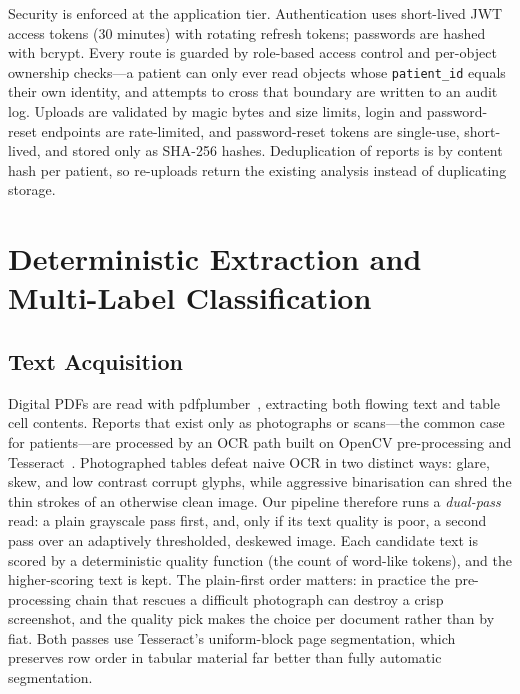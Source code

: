 \documentclass[conference]{IEEEtran}
\begin{document}
Security is enforced at the application tier. Authentication uses
short-lived JWT access tokens (30 minutes) with rotating refresh
tokens; passwords are hashed with bcrypt. Every route is guarded by
role-based access control and per-object ownership checks---a patient
can only ever read objects whose \texttt{patient\_id} equals their own
identity, and attempts to cross that boundary are written to an audit
log. Uploads are validated by magic bytes and size limits, login and
password-reset endpoints are rate-limited, and password-reset tokens
are single-use, short-lived, and stored only as SHA-256 hashes.
Deduplication of reports is by content hash per patient, so re-uploads
return the existing analysis instead of duplicating storage.

\section{Deterministic Extraction and Multi-Label Classification}

\subsection{Text Acquisition}
Digital PDFs are read with pdfplumber~\cite{pdfplumber}, extracting both
flowing text and table cell contents. Reports that exist only as
photographs or scans---the common case for patients---are processed by
an OCR path built on OpenCV pre-processing and
Tesseract~\cite{smith2007tesseract}. Photographed tables defeat naive
OCR in two distinct ways: glare, skew, and low contrast corrupt glyphs,
while aggressive binarisation can shred the thin strokes of an
otherwise clean image. Our pipeline therefore runs a \emph{dual-pass}
read: a plain grayscale pass first, and, only if its text quality is
poor, a second pass over an adaptively thresholded, deskewed image.
Each candidate text is scored by a deterministic quality function
(the count of word-like tokens), and the higher-scoring text is kept.
The plain-first order matters: in practice the pre-processing chain
that rescues a difficult photograph can destroy a crisp screenshot,
and the quality pick makes the choice per document rather than by
fiat. Both passes use Tesseract's uniform-block page segmentation,
which preserves row order in tabular material far better than fully
automatic segmentation.
\end{document}
